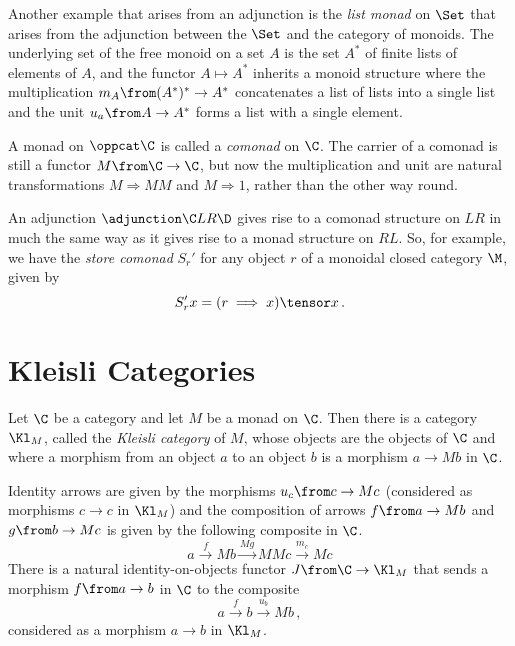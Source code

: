\begin{example}
  Another example that arises from an adjunction is the \emph{list monad} on $\Set$ that arises from the adjunction between the $\Set$ and the category of monoids.
  The underlying set of the free monoid on a set $A$ is the set $A^*$ of finite lists of elements of $A$, and the functor $A\mapsto A^*$ inherits a monoid structure where the multiplication $m_A\from (A^*)^* \to A^*$ concatenates a list of lists into a single list and the unit $u_a \from A \to A^*$ forms a list with a single element.  
\end{example}
\begin{example}
  A monad on $\oppcat\C$ is called a \emph{comonad} on $\C$.  
  The carrier of a comonad is still a functor $M\from \C\to\C$, but now the multiplication and unit are natural transformations $M\Rightarrow MM$ and $M\Rightarrow 1$, rather than the other way round.  

  An adjunction $\adjunction\C LR\D$ gives rise to a comonad structure on $LR$ in much the same way as it gives rise to a monad structure on $RL$.  
  So, for example, we have the \emph{store comonad} $S_r'$ for any object $r$ of a monoidal closed category $\M$, given by
  \[
    S_r'x = (r \implies x) \tensor x\,.
    \]
\end{example}

\section{Kleisli Categories}

Let $\C$ be a category and let $M$ be a monad on $\C$.  
Then \cite{Kleisli} there is a category $\Kl_M$, called the \emph{Kleisli category} of $M$, whose objects are the objects of $\C$ and where a morphism from an object $a$ to an object $b$ is a morphism $a \to Mb$ in $\C$.

Identity arrows are given by the morphisms $u_c\from c \to M c$ (considered as morphisms $c\to c$ in $\Kl_M$) and the composition of arrows $f\from a \to Mb$ and $g \from b \to Mc$ is given by the following composite in $\C$.
\[
  a \xrightarrow{f}
  Mb \xrightarrow{Mg}
  MMc \xrightarrow{m_c}
  M c
  \]
There is a natural identity-on-objects functor $J\from \C \to \Kl_M$ that sends a morphism $f\from a \to b$ in $\C$ to the composite
\[
  a \xrightarrow{f}
  b \xrightarrow{u_b}
  M b\,,
  \]
considered as a morphism $a\to b$ in $\Kl_M$.

